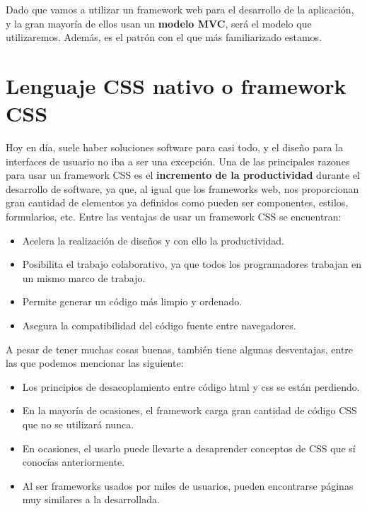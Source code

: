 Dado que vamos a utilizar un framework web para el desarrollo de la aplicación, y la gran
mayoría de ellos usan un \textbf{modelo MVC}, será el modelo que utilizaremos. Además, es el
patrón con el que más familiarizado estamos.

\section{Lenguaje CSS nativo o framework CSS} \label{sec:css-frameworkcss}
Hoy en día, suele haber soluciones software para casi todo, y el diseño para la interfaces
de usuario no iba a ser una excepción. Una de las principales razones para usar un framework
CSS es el \textbf{incremento de la productividad} durante el desarrollo de software, ya que,
al igual que los frameworks web, nos proporcionan gran cantidad de elementos ya definidos
como pueden ser componentes, estilos, formularios, etc. Entre las ventajas de usar un
framework CSS se encuentran:

    \begin{itemize}
        \item Acelera la realización de diseños y con ello la productividad.
        \item Posibilita el trabajo colaborativo, ya que todos los programadores
        trabajan en un mismo marco de trabajo.
        \item Permite generar un código más limpio y ordenado.
        \item Asegura la compatibilidad del código fuente entre navegadores.
    \end{itemize}

A pesar de tener muchas cosas buenas, también tiene algunas desventajas, entre las que
podemos mencionar las siguiente:

    \begin{itemize}
        \item Los principios de desacoplamiento entre código html y css se están perdiendo.
        \item En la mayoría de ocasiones, el framework carga gran cantidad de código CSS
        que no se utilizará nunca.
        \item En ocasiones, el usarlo puede llevarte a desaprender conceptos de CSS que sí
        conocías anteriormente.
        \item Al ser frameworks usados por miles de usuarios, pueden encontrarse páginas
        muy similares a la desarrollada.
    \end{itemize}

